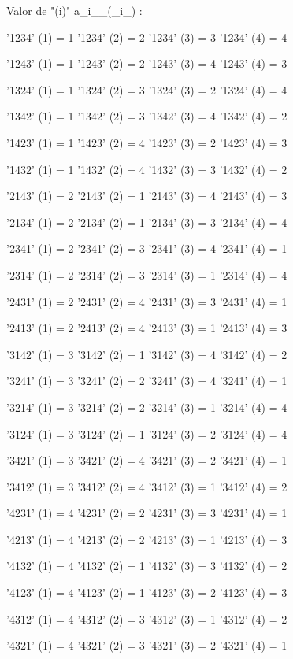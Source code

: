 \documentclass{report}
\begin{document}
Valor de "(i)" \in a_i_\sigma_(_i_) :

\vspace{0,2cm}

'1234' (1) = 1
'1234' (2) = 2
'1234' (3) = 3
'1234' (4) = 4

'1243' (1) = 1
'1243' (2) = 2
'1243' (3) = 4
'1243' (4) = 3

'1324' (1) = 1
'1324' (2) = 3
'1324' (3) = 2
'1324' (4) = 4

'1342' (1) = 1
'1342' (2) = 3
'1342' (3) = 4
'1342' (4) = 2

'1423' (1) = 1
'1423' (2) = 4
'1423' (3) = 2
'1423' (4) = 3

'1432' (1) = 1
'1432' (2) = 4
'1432' (3) = 3
'1432' (4) = 2

'2143' (1) = 2
'2143' (2) = 1
'2143' (3) = 4
'2143' (4) = 3

'2134' (1) = 2
'2134' (2) = 1
'2134' (3) = 3
'2134' (4) = 4

'2341' (1) = 2
'2341' (2) = 3
'2341' (3) = 4
'2341' (4) = 1

'2314' (1) = 2
'2314' (2) = 3
'2314' (3) = 1
'2314' (4) = 4

'2431' (1) = 2
'2431' (2) = 4
'2431' (3) = 3
'2431' (4) = 1

'2413' (1) = 2
'2413' (2) = 4
'2413' (3) = 1
'2413' (4) = 3

'3142' (1) = 3
'3142' (2) = 1
'3142' (3) = 4
'3142' (4) = 2

'3241' (1) = 3
'3241' (2) = 2
'3241' (3) = 4
'3241' (4) = 1

'3214' (1) = 3
'3214' (2) = 2
'3214' (3) = 1
'3214' (4) = 4

'3124' (1) = 3
'3124' (2) = 1
'3124' (3) = 2
'3124' (4) = 4

'3421' (1) = 3
'3421' (2) = 4
'3421' (3) = 2
'3421' (4) = 1

'3412' (1) = 3
'3412' (2) = 4
'3412' (3) = 1
'3412' (4) = 2

'4231' (1) = 4
'4231' (2) = 2
'4231' (3) = 3
'4231' (4) = 1

'4213' (1) = 4
'4213' (2) = 2
'4213' (3) = 1
'4213' (4) = 3

'4132' (1) = 4
'4132' (2) = 1
'4132' (3) = 3
'4132' (4) = 2

'4123' (1) = 4
'4123' (2) = 1
'4123' (3) = 2
'4123' (4) = 3

'4312' (1) = 4
'4312' (2) = 3
'4312' (3) = 1
'4312' (4) = 2

'4321' (1) = 4
'4321' (2) = 3
'4321' (3) = 2
'4321' (4) = 1 
\end{document}
